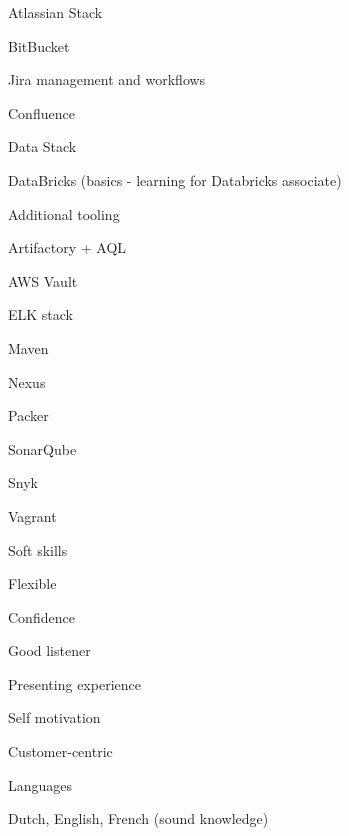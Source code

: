 \begin{cvskills}
  \cvskill
    {Atlassian Stack} %
    {
      \begin{cvitems} %
        \item {BitBucket} %
        \item {Jira management and workflows} %
        \item {Confluence} %
      \end{cvitems}
    }

  \cvskill
    {Data Stack} %
    {
      \begin{cvitems} %
        \item {DataBricks (basics - learning for Databricks associate)} %
      \end{cvitems}
    }

  \cvskill
    {Additional tooling} %
    {
      \begin{cvitems} %
        \item {Artifactory + AQL} %
        \item {AWS Vault} %
        \item {ELK stack} %
        \item {Maven} %
        \item {Nexus} %
        \item {Packer} %
        \item {SonarQube} %
        \item {Snyk} %
        \item {Vagrant} %
      \end{cvitems}
    }

  \cvskill
    {Soft skills} %
    {
      \begin{cvitems} %
        \item {Flexible} %
        \item {Confidence} %
        \item {Good listener} %
        \item {Presenting experience} %
        \item {Self motivation} %
        \item {Customer-centric} %
      \end{cvitems}
    }

  \cvskill
    {Languages} %
    {
      \begin{cvitems} %
        \item {Dutch, English, French (sound knowledge)} %
      \end{cvitems}
    }

\end{cvskills}
